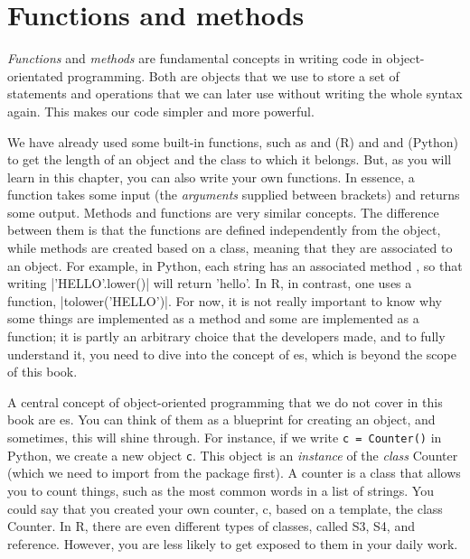 \section{Functions and methods}
\label{sec:functions}

\emph{Functions} and \emph{methods} are fundamental concepts in
writing code in object-orientated programming. Both are objects that
we use to store a set of statements and operations that we can later
use without writing the whole syntax again. This makes our code
simpler and more powerful.

We have already used some built-in functions, such as  and
 (R) and  and  (Python) to get the length
of an object and the class to which it belongs. But, as you will learn
in this chapter, you can also write your own functions. In essence, a
function takes some input (the \emph{arguments} supplied between
brackets) and returns some output.  Methods and functions are very
similar concepts. The difference between them is that the functions
are defined independently from the object, while methods are created
based on a class, meaning that they are associated to an object. For
example, in Python, each string has an associated method ,
so that writing |'HELLO'.lower()| will return 'hello'. In R, in
contrast, one uses a function, |tolower('HELLO')|. For now, it is not
really important to know why some things are implemented as a method
and some are implemented as a function; it is partly an arbitrary
choice that the developers made, and to fully understand it, you need
to dive into the concept of es, which is beyond the scope of
this book.

\begin{feature}
  A central concept of object-oriented programming that we do not cover in this book are es. You can think of them as a blueprint for creating an object, and sometimes, this will shine through. For instance, if we write \texttt{c = Counter()} in Python, we create a new object \texttt{c}. This object is an \emph{instance} of the \emph{class} Counter (which we need to import from the package  first). A counter is a class that allows you to count things, such as the most common words in a list of strings. You could say that you created your own counter, c, based on a template, the class Counter. In R, there are even different types of classes, called S3, S4, and reference. However, you are less likely to get exposed to them in your daily work.
  \end{feature}



